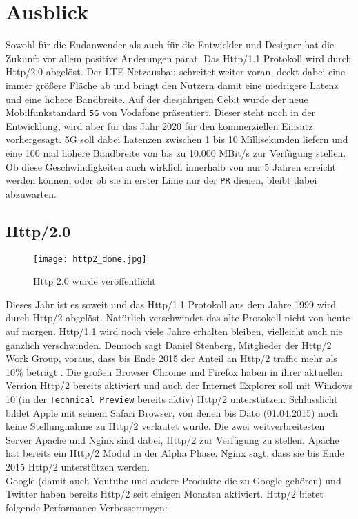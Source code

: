 \section{Ausblick} %
\label{sec:ausblick}
	Sowohl für die Endanwender als auch für die Entwickler und Designer hat die Zukunft vor allem positive Änderungen parat. Das Http/1.1 Protokoll wird durch Http/2.0 abgelöst. Der LTE-Netzausbau schreitet weiter voran, deckt dabei eine immer größere Fläche ab und bringt den Nutzern damit eine niedrigere Latenz und eine höhere Bandbreite. Auf der diesjährigen Cebit wurde der neue Mobilfunkstandard \texttt{5G} von Vodafone präsentiert. Dieser steht noch in der Entwicklung, wird aber für das Jahr 2020 für den kommerziellen Einsatz vorhergesagt. 5G soll dabei Latenzen zwischen 1 bis 10 Millisekunden liefern und eine 100 mal höhere Bandbreite von bis zu 10.000 MBit/s zur Verfügung stellen.\autocite{lte-anbieter15} Ob diese Geschwindigkeiten auch wirklich innerhalb von nur 5 Jahren erreicht werden können, oder ob sie in erster Linie nur der \texttt{PR} dienen, bleibt dabei abzuwarten.

	\subsection{Http/2.0} %
	\label{sub:http_2_0}
		\begin{figure}[htbp]
			\begin{center}
				\texttt{[image: http2\_done.jpg]}
				\caption{Http 2.0 wurde veröffentlicht}
				\label{fig:http2_done}
			\end{center}
		\end{figure}

		Dieses Jahr ist es soweit und das Http/1.1 Protokoll aus dem Jahre 1999 wird durch Http/2 abgelöst. Natürlich verschwindet das alte Protokoll nicht von heute auf morgen. Http/1.1 wird noch viele Jahre erhalten bleiben, vielleicht auch nie gänzlich verschwinden. Dennoch sagt Daniel Stenberg, Mitglieder der Http/2 Work Group, voraus, dass bis Ende 2015 der Anteil an Http/2 traffic mehr als 10\% beträgt \autocite{stenberg15}. Die großen Browser Chrome und Firefox haben in ihrer aktuellen Version Http/2 bereits aktiviert und auch der Internet Explorer soll mit Windows 10 (in der \texttt{Technical Preview} bereits aktiv) Http/2 unterstützen.\autocite{microsoft14} Schlusslicht bildet Apple mit seinem Safari Browser, von denen bis Dato (01.04.2015) noch keine Stellungnahme zu Http/2 verlautet wurde.
		Die zwei weitverbreitesten Server Apache und Nginx sind dabei, Http/2 zur Verfügung zu stellen. Apache hat bereits ein Http/2 Modul in der Alpha Phase. Nginx sagt, dass sie bis Ende 2015 Http/2 unterstützen werden.\\
		Google (damit auch Youtube und andere Produkte die zu Google gehören) und Twitter haben bereits Http/2 seit einigen Monaten aktiviert. Http/2 bietet folgende Performance Verbesserungen:

